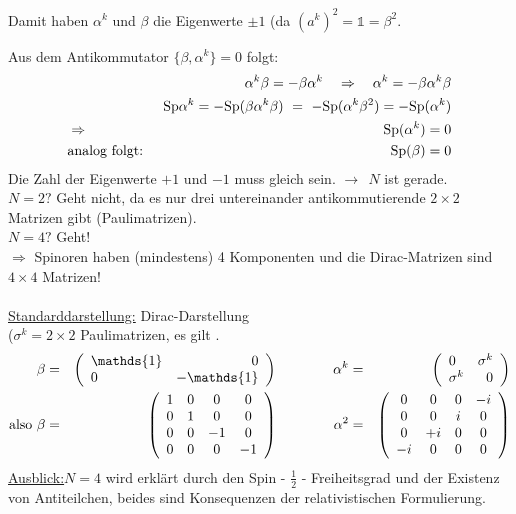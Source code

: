 Damit haben $\alpha^k$ und $\beta$ die Eigenwerte $\pm 1$ (da $(a^k)^2 = \mathds 1 = \beta ^2$.

Aus dem Antikommutator $\{\beta, \alpha^k\}= 0$ folgt:
\begin{eqnarray*}
&&\alpha^k \beta = - \beta \alpha^k \quad\Rightarrow\quad \alpha^k = - \beta \alpha^k \beta
\\
&& \text{Sp} \alpha^k = - \text{Sp}(\beta\alpha^k \beta) \ = \ -\text{Sp}(\alpha^k \beta^2) = - \text{Sp}(\alpha^k)
\\
&\Rightarrow& \text{Sp} (\alpha^k) = 0 
\\
&\text{analog folgt: }& \text{Sp}(\beta) = 0
\end{eqnarray*}
Die Zahl der Eigenwerte $+1$ und $-1$ muss gleich sein. $\longrightarrow \ \ N$ ist gerade.\\
\underline{$N= 2?$} Geht nicht, da es nur drei untereinander antikommutierende $2\times2$ Matrizen gibt (Paulimatrizen).\\
\underline{$N = 4?$} Geht!\\
$\Longrightarrow$ Spinoren haben (mindestens) 4 Komponenten und die Dirac-Matrizen sind $4\times4$ Matrizen!\\ \\
\underline{Standarddarstellung:} Dirac-Darstellung\\
($\sigma^k = 2\times 2 $ Paulimatrizen, es gilt .
\begin{alignat}{4}
\beta \g \left ( \begin{array}{lr}\mathds{1} & 0 \\ 0 & -\mathds{1} \end{array} \right) \qquad \qquad \alpha^k \g \left ( \begin{array}{lr} 0 &\sigma^k \\ \sigma^k & 0 \end{array}\ri )\\
\text{also   } \beta \g \left ( \begin{array}{cccc} 1 &0&0&0\\0&1&0&0\\0&0&-1&0\\0&0&0&-1\end{array}\ri) \qquad\qquad \alpha^2 \g \left( \begin{array}{cccc}0&0&0&-i\\0&0&i&0\\0&+i&0&0\\-i&0&0&0\end{array}\ri)
\end{alignat}
\underline{Ausblick:}\babsatz $N=4$ wird erklärt durch den Spin - $\frac 1 2$ - Freiheitsgrad und der Existenz von Antiteilchen, beides sind Konsequenzen der relativistischen Formulierung.\eabsatz

